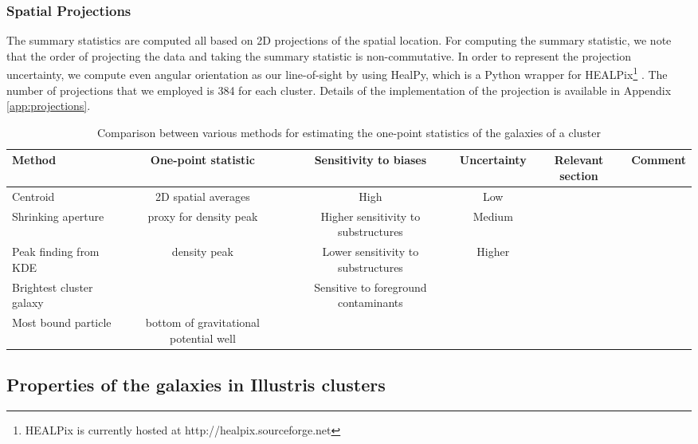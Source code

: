 \subsubsection{Spatial Projections}
\label{subsubsec:projections}
The summary statistics are computed all based on 2D projections of the
spatial location.
For computing the summary statistic, we note that 
the order of projecting the data and taking the summary statistic is
non-commutative.  
In order to represent the projection uncertainty, we compute even angular
orientation as our line-of-sight
by using HealPy, which is a Python wrapper for HEALPix\footnote{HEALPix is
currently hosted at http://healpix.sourceforge.net}
\citep{Gorski2005}. 
The number of projections that we employed is 384 for each cluster.
Details of the implementation of the projection is available in Appendix
\ref{app:projections}.

\begin{table*}
\begin{center}
\begin{minipage}{180mm} 
	\caption{Comparison between various methods for estimating the one-point
		statistics of the galaxies of a cluster 
\label{tab:centroid_comparison}} 
	\begin{tabular}{@{}lccccc@{}}
\hline 
Method &  One-point statistic & Sensitivity to biases & Uncertainty  & Relevant
section & Comment  \\ \hline
Centroid & 2D spatial averages & High & Low & \\
Shrinking aperture & proxy for density peak & Higher sensitivity to substructures & Medium
& \\
Peak finding from KDE & density peak & Lower sensitivity to substructures &
Higher & \\
Brightest cluster galaxy & & Sensitive to foreground contaminants & \\ 
Most bound particle & bottom of gravitational potential well &  & 
&  \\
\hline
\end{tabular} 
\label{tab:summary_stat_info} 
\end{minipage}
\end{center} 
\end{table*}
\subsection{Properties of the galaxies in Illustris clusters}
